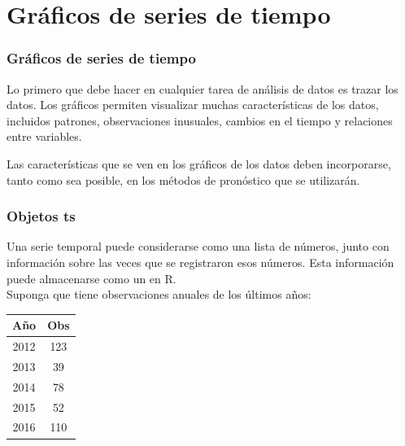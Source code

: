 \documentclass[10pt]{beamer}
\begin{document}




\section{Gráficos de series de tiempo}

\begin{frame}
\frametitle{Gráficos de series de tiempo}

Lo primero que debe hacer en cualquier tarea de análisis de datos es trazar los datos. Los gráficos permiten visualizar muchas características de los datos, incluidos patrones, observaciones inusuales, cambios en el tiempo y relaciones entre variables. 

\vspace{4mm}
Las características que se ven en los gráficos de los datos deben incorporarse, tanto como sea posible, en los métodos de pronóstico que se utilizarán. 


\end{frame}





\begin{frame}[fragile]
\frametitle{Objetos ts}


Una serie temporal puede considerarse como una lista de números, junto con información sobre las veces que se registraron esos números. Esta información puede almacenarse como un  en R.\\

\vspace{4mm}
Suponga que tiene observaciones anuales de los últimos años:

\begin{center}
\begin{tabular}{cc}
\hline 
Año & Obs \\ 
\hline 
2012 & 123 \\ 
2013 & 39 \\ 
2014 & 78 \\ 
2015 & 52 \\ 
2016 & 110 \\ 
\hline 
\end{tabular} 

\end{center}


\end{frame}
\end{document}
